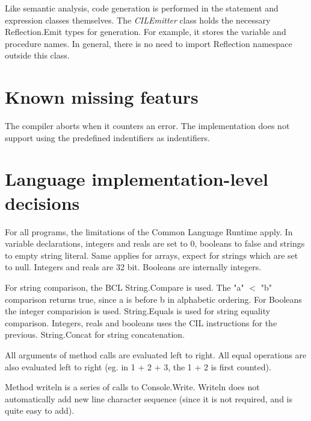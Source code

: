 \documentclass[english]{article}
\begin{document}
Like semantic analysis, code generation is performed in the statement and expression classes themselves.
The \emph{CILEmitter} class holds the necessary Reflection.Emit types for generation.
For example, it stores the variable and procedure names.
In general, there is no need to import Reflection namespace outside this class.

\section{Known missing featurs}
The compiler aborts when it counters an error.
The implementation does not support using the predefined indentifiers as indentifiers.


\section{Language implementation-level decisions}
For all programs, the limitations of the Common Language Runtime apply.
In variable declarations, integers and reals are set to 0, booleans to false and strings to empty string literal.
Same applies for arrays, expect for strings which are set to null.
Integers and reals are 32 bit.
Booleans are internally integers.

For string comparison, the BCL String.Compare is used.
The "a" $<$ "b" comparison returns true, since a is before b in alphabetic ordering.
For Booleans the integer comparision is used.
String.Equals is used for string equality comparison.
Integers, reals and booleans uses the CIL instructions for the previous.
String.Concat for string concatenation.

All arguments of method calls are evaluated left to right.
All equal operations are also evaluated left to right (eg. in 1 + 2 + 3, the 1 + 2 is first counted).

Method writeln is a series of calls to Console.Write.
Writeln does not automatically add new line character sequence (since it is not required, and is quite easy to add).
\end{document}
